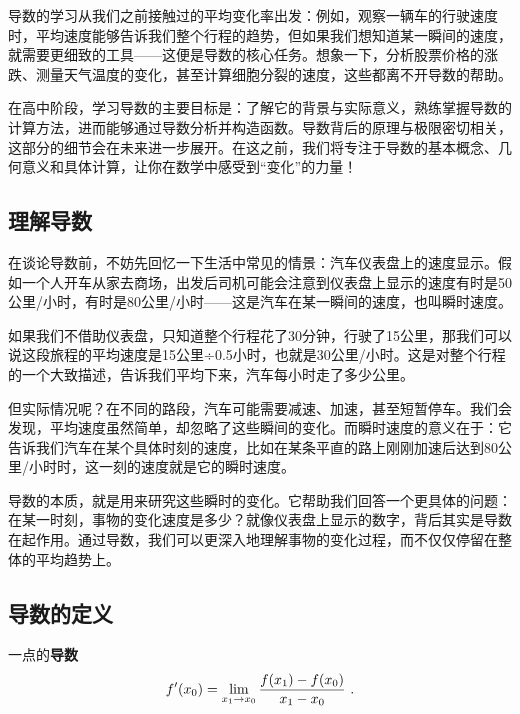 
\begin{issues}
\issueDraft
\end{issues}

导数的学习从我们之前接触过的平均变化率出发：例如，观察一辆车的行驶速度时，平均速度能够告诉我们整个行程的趋势，但如果我们想知道某一瞬间的速度，就需要更细致的工具——这便是导数的核心任务。想象一下，分析股票价格的涨跌、测量天气温度的变化，甚至计算细胞分裂的速度，这些都离不开导数的帮助。

在高中阶段，学习导数的主要目标是：了解它的背景与实际意义，熟练掌握导数的计算方法，进而能够通过导数分析并构造函数。导数背后的原理与极限密切相关，这部分的细节会在未来进一步展开。在这之前，我们将专注于导数的基本概念、几何意义和具体计算，让你在数学中感受到“变化”的力量！

\subsection{理解导数}

在谈论导数前，不妨先回忆一下生活中常见的情景：汽车仪表盘上的速度显示。假如一个人开车从家去商场，出发后司机可能会注意到仪表盘上显示的速度有时是50公里/小时，有时是80公里/小时——这是汽车在某一瞬间的速度，也叫瞬时速度。

如果我们不借助仪表盘，只知道整个行程花了30分钟，行驶了15公里，那我们可以说这段旅程的平均速度是15公里÷0.5小时，也就是30公里/小时。这是对整个行程的一个大致描述，告诉我们平均下来，汽车每小时走了多少公里。

但实际情况呢？在不同的路段，汽车可能需要减速、加速，甚至短暂停车。我们会发现，平均速度虽然简单，却忽略了这些瞬间的变化。而瞬时速度的意义在于：它告诉我们汽车在某个具体时刻的速度，比如在某条平直的路上刚刚加速后达到80公里/小时时，这一刻的速度就是它的瞬时速度。

导数的本质，就是用来研究这些瞬时的变化。它帮助我们回答一个更具体的问题：在某一时刻，事物的变化速度是多少？就像仪表盘上显示的数字，背后其实是导数在起作用。通过导数，我们可以更深入地理解事物的变化过程，而不仅仅停留在整体的平均趋势上。

\subsection{导数的定义}
一点的\textbf{导数}
\begin{equation}
f'(x_0)=\lim_{x_1\to x_0}{f(x_1)-f(x_0)\over x_1-x_0}~.
\end{equation}


